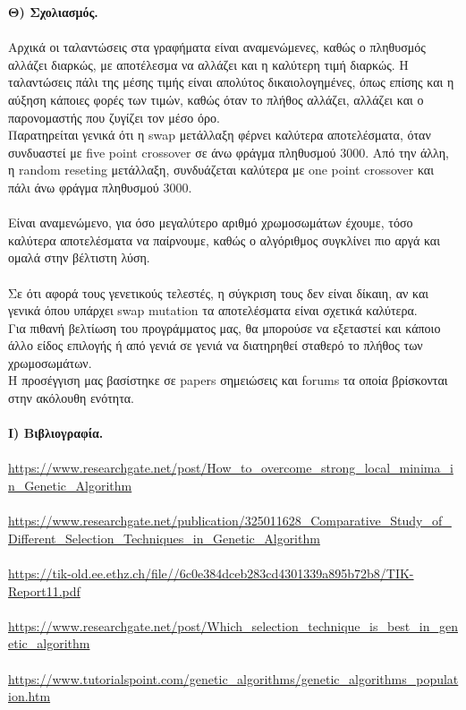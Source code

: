\documentclass[12pt]{article}
\begin{document}
\FloatBarrier
{\bfseries Θ) Σχολιασμός.}\\\\
Αρχικά οι ταλαντώσεις στα γραφήματα είναι αναμενώμενες, καθώς ο πληθυσμός αλλάζει διαρκώς, με αποτέλεσμα να αλλάζει και η καλύτερη τιμή διαρκώς. Η ταλαντώσεις πάλι της μέσης τιμής είναι απολύτος δικαιολογημένες, όπως επίσης και η αύξηση κάποιες φορές των τιμών, καθώς όταν το πλήθος αλλάζει, αλλάζει και ο παρονομαστής που ζυγίζει τον μέσο όρο.\\ Παρατηρείται γενικά ότι η swap μετάλλαξη φέρνει καλύτερα αποτελέσματα, όταν συνδυαστεί με five point crossover σε άνω φράγμα πληθυσμού 3000. Από την άλλη, η random reseting μετάλλαξη, συνδυάζεται καλύτερα με one point crossover και πάλι άνω φράγμα πληθυσμού 3000.\\\\
Είναι αναμενώμενο, για όσο μεγαλύτερο αριθμό χρωμοσωμάτων έχουμε, τόσο καλύτερα αποτελέσματα να παίρνουμε, καθώς ο αλγόριθμος συγκλίνει πιο αργά και ομαλά στην βέλτιστη λύση.\\\\
Σε ότι αφορά τους γενετικούς τελεστές, η σύγκριση τους δεν είναι δίκαιη, αν και γενικά όπου υπάρχει swap mutation τα αποτελέσματα είναι σχετικά καλύτερα.\\Για πιθανή βελτίωση του προγράμματος μας, θα μπορούσε να εξεταστεί και κάποιο άλλο είδος επιλογής ή από γενιά σε γενιά να διατηρηθεί σταθερό το πλήθος των χρωμοσωμάτων.\\Η προσέγγιση μας βασίστηκε σε papers σημειώσεις και forums τα οποία βρίσκονται στην ακόλουθη ενότητα.\\\\
{\bfseries Ι) Βιβλιογραφία.}\\\\
\url{https://www.researchgate.net/post/How_to_overcome_strong_local_minima_in_Genetic_Algorithm}\\\\

\url{https://www.researchgate.net/publication/325011628_Comparative_Study_of_Different_Selection_Techniques_in_Genetic_Algorithm}\\\\

\url{https://tik-old.ee.ethz.ch/file//6c0e384dceb283cd4301339a895b72b8/TIK-Report11.pdf}\\\\

\url{https://www.researchgate.net/post/Which_selection_technique_is_best_in_genetic_algorithm}\\\\

\url{https://www.tutorialspoint.com/genetic_algorithms/genetic_algorithms_population.htm}\\\\
\end{document}

